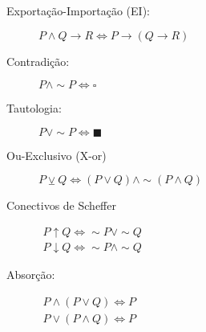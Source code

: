 \documentclass[12pt, a4paper,final]{article}
\begin{document}
\begin{description}
        \item[Exportação-Importação (EI):] $P\wedge Q\rightarrow R \Leftrightarrow P\rightarrow(Q\rightarrow R)$
        
        \item[Contradição:] $P\wedge \sim P \Leftrightarrow \square $
        
        \item[Tautologia:] $ P\vee \sim P \Leftrightarrow \blacksquare    $
        
        \item[Ou-Exclusivo (X-or)] $P \veebar Q \Leftrightarrow (P \vee Q) \wedge \sim (P \wedge Q)$
        
        \item[Conectivos de Scheffer] $\begin{array}{l} P \uparrow Q \Leftrightarrow \sim P \vee \sim Q \\  P \downarrow Q \Leftrightarrow \sim P \wedge \sim Q \end{array}$
        
        \item [Absorção:] $\begin{array}{l}P \wedge (P \vee Q) \Leftrightarrow P\\P \vee (P \wedge Q) \Leftrightarrow P\end{array}$
        
    \end{description}
    
\end{document}
